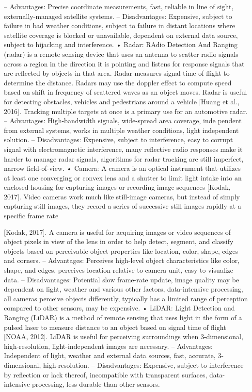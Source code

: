 – Advantages: Precise coordinate measurements, fast, reliable in line of
sight, externally-managed satellite systems.
– Disadvantages: Expensive, subject to failure in bad weather conditions,
subject to failure in distant locations where satellite coverage is blocked or
unavailable, dependent on external data source, subject to hijacking and
interference.
• Radar: RAdio Detection And Ranging (radar) is a remote sensing device that uses an antenna to scatter radio signals across a region in the direction it is
pointing and listens for response signals that are reﬂected by objects in that area.
Radar measures signal time of ﬂight to determine the distance. Radars may use
the doppler eﬀect to compute speed based on shift in frequency of scattered
waves as an object moves. Radar is useful for detecting obstacles, vehicles and
pedestrians around a vehicle [Huang et al., 2016]. Tracking multiple targets at
once is a primary use for an automotive radar.
– Advantages: High-bandwidth signals, wide-spread area coverage, inde
pendent from external systems, works in multiple weather conditions, light
independent solution.
– Disadvantages: Expensive, subject to interference, easy to corrupt signal
with electromagnetic interference, many reﬂective radio responses make it
harder to manage radar signals, algorithms for radar tracking are still
imperfect, narrow ﬁeld-of-view.
• Camera: A camera is an optical instrument that utilizes at least one converging or convex lens and a shutter to limit light intake into an enclosed housing for
capturing images or recording image sequences [Kodak, 2017]. Video cameras
work much like still-image cameras, but instead of simply capturing still images,
they record a series of successive still images rapidly at a speciﬁc frame rate

[Kodak, 2017]. A camera is useful for acquiring images or video sequences of
object pixels in view of the lens in order to help detect, segment, and classify
objects based on perceivable object properties like location, color, shape, edges
and corners.
– Advantages: Perceives high-level object characteristics like color, shape,
and edges, perceives location relative to camera unit, easy to visualize
data.
– Disadvantages: Potential slow frame-rate update, image quality may
be dependent on light, weather and various other factors, data-intensive
processing, all cameras perceive objects diﬀerently, typically has a limited
range of perception compared to other sensors, may be expensive.
• LiDAR: Light Detection and Ranging (LiDAR) is a method of remote sensing that uses light in the form of a pulsed laser to measure distance to an object
based on signal time of ﬂight [NOAA, 2012]. LiDAR is useful for perceiving
surroundings when 3-dimensional, high-resolution, light-independent images are
necessary.
– Advantages: Independent of light, weather and external data sources,
fast, accurate, 3-dimensional, high-resolution.
– Disadvantages: Expensive, subject to interference by reﬂection or lack
thereof, incompatible with transparent surfaces, data-intensive processing,
less durable than other sensors.

